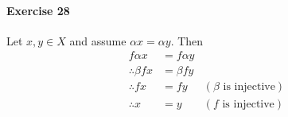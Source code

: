 \documentclass{report}
\begin{document}
    \paragraph{Exercise 28}
    Let $x, y \in X$ and assume $\alpha x = \alpha y$. Then
    \begin{align*}
        f \alpha x & = f \alpha y \\
        \therefore \beta f x & = \beta f y \\
        \therefore f x & = f y & (\text{$\beta$ is injective}) \\
        \therefore x & = y & (\text{$f$ is injective})
    \end{align*}
\end{document}
